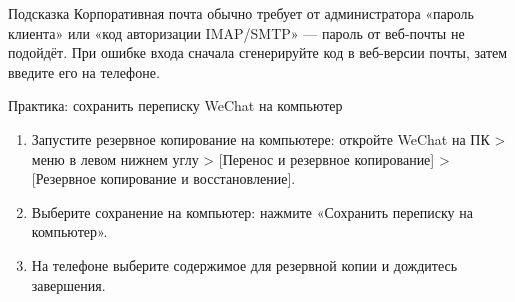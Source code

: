 \begin{tcbinfo}{Подсказка}
Корпоративная почта обычно требует от администратора «пароль клиента» или «код авторизации IMAP/SMTP» — пароль от веб-почты не подойдёт. При ошибке входа сначала сгенерируйте код в веб-версии почты, затем введите его на телефоне.

\end{tcbinfo}

\begin{tcbpractice}{Практика: сохранить переписку WeChat на компьютер}
\begin{enumerate}
  \item Запустите резервное копирование на компьютере: откройте WeChat на ПК > меню в левом нижнем углу > [Перенос и резервное копирование] > [Резервное копирование и восстановление].
  \item Выберите сохранение на компьютер: нажмите «Сохранить переписку на компьютер».
  \item На телефоне выберите содержимое для резервной копии и дождитесь завершения.
\end{enumerate}

\end{tcbpractice}
